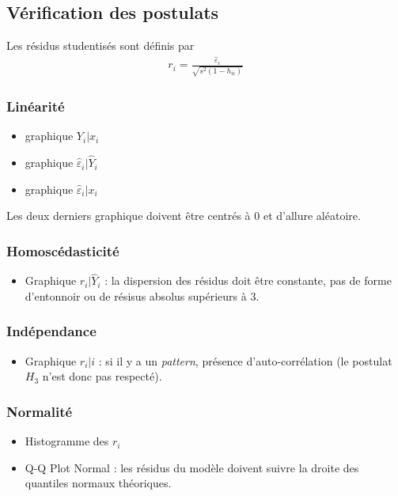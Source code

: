 \documentclass[10pt, french]{article}
\begin{document}
\begin{multicols*}{3}
\subsection*{Vérification des postulats}
Les résidus studentisés sont définis par
\begin{align*}
r_i = \frac{\hat{\varepsilon}_i}{\sqrt{s^2(1 - h_{ii})}}
\end{align*}
\subsubsection*{Linéarité}
\begin{itemize}
\item graphique $Y_i | x_i$
\item graphique $\hat{\varepsilon}_i | \hat{Y}_i$
\item graphique $\hat{\varepsilon}_i | x_i$
\end{itemize}
Les deux derniers graphique doivent être centrés à 0 et d'allure aléatoire.

\subsubsection*{Homoscédasticité}
\begin{itemize}
\item Graphique $r_i | \hat{Y}_i$ : la dispersion des résidus doit être constante, pas de forme d'entonnoir ou de résisus absolus supérieurs à 3.
\end{itemize}

\subsubsection*{Indépendance}
\begin{itemize}
\item Graphique $r_i|i$ : si il y a un \textit{pattern}, présence d'auto-corrélation (le postulat $H_3$ n'est donc pas respecté).
\end{itemize}

\subsubsection*{Normalité}
\begin{itemize}
\item Histogramme des $r_i$
\item Q-Q Plot Normal : les résidus du modèle doivent suivre la droite des quantiles normaux théoriques.
\end{itemize}





\end{multicols*}
\end{document}

